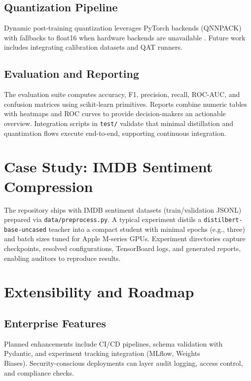 \documentclass[conference]{IEEEtran}
\begin{document}
\subsection{Quantization Pipeline}
Dynamic post-training quantization leverages PyTorch backends (QNNPACK) with fallbacks to float16 when hardware backends are unavailable \cite{jacob2018quantization}. Future work includes integrating calibration datasets and QAT runners.

\subsection{Evaluation and Reporting}
The evaluation suite computes accuracy, F1, precision, recall, ROC-AUC, and confusion matrices using scikit-learn primitives. Reports combine numeric tables with heatmaps and ROC curves to provide decision-makers an actionable overview. Integration scripts in \texttt{test/} validate that minimal distillation and quantization flows execute end-to-end, supporting continuous integration.

\section{Case Study: IMDB Sentiment Compression}
The repository ships with IMDB sentiment datasets (train/validation JSONL) prepared via \texttt{data/preprocess.py}. A typical experiment distils a \texttt{distilbert-base-uncased} teacher into a compact student with minimal epochs (e.g., three) and batch sizes tuned for Apple M-series GPUs. Experiment directories capture checkpoints, resolved configurations, TensorBoard logs, and generated reports, enabling auditors to reproduce results.

\section{Extensibility and Roadmap}
\subsection{Enterprise Features}
Planned enhancements include CI/CD pipelines, schema validation with Pydantic, and experiment tracking integration (MLflow, Weights \\ Biases). Security-conscious deployments can layer audit logging, access control, and compliance checks.
\end{document}
